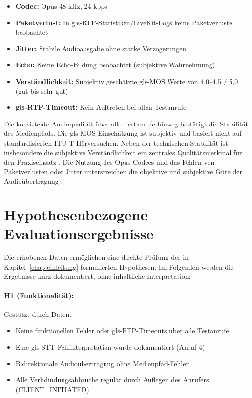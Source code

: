 \begin{itemize}
  \item \textbf{Codec:} Opus 48 kHz, 24 kbps \parencite{rfc6716}
  \item \textbf{Paketverlust:} In \gls{gls-RTP}-Statistiken/LiveKit-Logs keine Paketverluste beobachtet
  \item \textbf{Jitter:} Stabile Audioausgabe ohne starke Verzögerungen
  \item \textbf{Echo:} Keine Echo-Bildung beobachtet (subjektive Wahrnehmung)
  \item \textbf{Verständlichkeit:} Subjektiv geschätzte \gls{gls-MOS} Werte von 4,0--4,5 / 5,0 (gut bis sehr gut)
  \item \textbf{\gls{gls-RTP}-Timeout:} Kein Auftreten bei allen Testanrufe
\end{itemize}

Die konsistente Audioqualität über alle Testanrufe hinweg bestätigt die Stabilität des Medienpfads. Die \gls{gls-MOS}-Einschätzung ist subjektiv und basiert nicht auf standardisierten ITU-T-Hörversuchen. Neben der technischen Stabilität ist insbesondere die subjektive Verständlichkeit ein zentrales Qualitätsmerkmal für den Praxiseinsatz \parencite{ITU-T-G114}. Die Nutzung des Opus-Codecs und das Fehlen von Paketverlusten oder Jitter unterstreichen die objektive und subjektive Güte der Audioübertragung \parencite{rfc6716}.

\section{Hypothesenbezogene Evaluationsergebnisse}
\label{sec:hypothesen-resultate}

Die erhobenen Daten ermöglichen eine direkte Prüfung der in Kapitel~\ref{chap:einleitung} formulierten Hypothesen. Im Folgenden werden die Ergebnisse kurz dokumentiert, ohne inhaltliche Interpretation:

\paragraph{H1 (Funktionalität):} Gestützt durch Daten.
\begin{itemize}
  \item Keine funktionellen Fehler oder \gls{gls-RTP}-Timeouts über alle Testanrufe
  \item Eine \gls{gls-STT}-Fehlinterpretation wurde dokumentiert (Anruf 4)
  \item Bidirektionale Audioübertragung ohne Medienpfad-Fehler
  \item Alle Verbdindungsabbrüche regulär durch Auflegen des Anrufers (CLIENT\_INITIATED)
\end{itemize}

